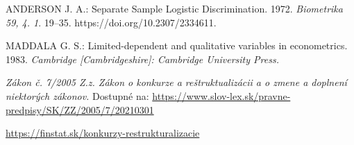 \begin{thebibliography}{99}
     ANDERSON J. A.: Separate Sample Logistic Discrimination. 1972. \emph{Biometrika 59, 4. 1}. 19–35. https://doi.org/10.2307/2334611.

     MADDALA G. S.: Limited-dependent and qualitative variables in econometrics. 1983. \emph{Cambridge [Cambridgeshire]: Cambridge University Press.}

     \emph{Zákon č. 7/2005 Z.z. Zákon o konkurze a reštruktualizácii a o zmene a doplnení niektorých zákonov.}
    Dostupné na: \url{https://www.slov-lex.sk/pravne-predpisy/SK/ZZ/2005/7/20210301}

     \url{https://finstat.sk/konkurzy-restrukturalizacie}

\end{thebibliography}
